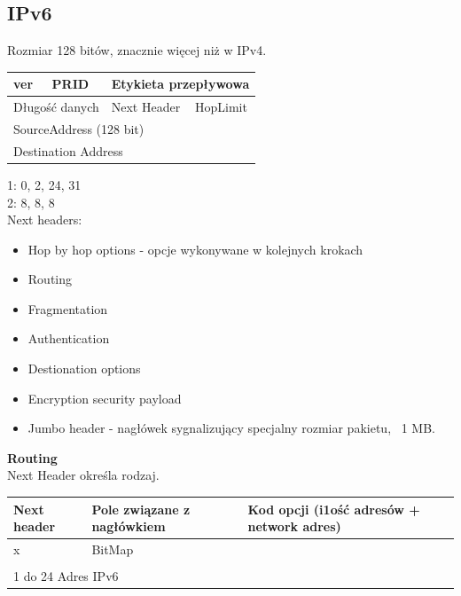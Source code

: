 \subsection{IPv6}
Rozmiar 128 bitów, znacznie więcej niż w IPv4.

\begin{table}[h]
	\begin{tabular}{|l|l|l|l|l|}
		\hline
		ver       & PRID       & \multicolumn{3}{l|}{Etykieta przepływowa}      \\ \hline
		\multicolumn{3}{|l|}{Długość danych} & Next Header      & HopLimit      \\ \hline
		\multicolumn{5}{|l|}{SourceAddress (128 bit)}                           \\ \hline
		\multicolumn{5}{|l|}{Destination Address}                               \\ \hline
	\end{tabular}
\end{table}
1: 0, 2, 24, 31\\
2: 8, 8, 8\\
Next headers:
\begin{itemize}
	\item Hop by hop options - opcje wykonywane w kolejnych krokach
	\item Routing
	\item Fragmentation
	\item Authentication
	\item Destionation options
	\item Encryption security payload
	\item Jumbo header - nagłówek sygnalizujący specjalny rozmiar pakietu, ~1 MB.
\end{itemize}
\textbf{Routing}\\
Next Header określa rodzaj.\\
\begin{table}[h]
	\begin{tabular}{|l|l|l|l|l|}
		\hline
		Next header & Pole związane z nagłówkiem & \multicolumn{3}{l|}{Kod opcji (i1ość adresów + network adres)} \\ \hline
		x           & \multicolumn{4}{l|}{BitMap}                                                                 \\ \hline
		\multicolumn{5}{|l|}{}                                                                                    \\ \hline
		\multicolumn{5}{|l|}{1 do 24 Adres IPv6}                                                                  \\ \hline
	\end{tabular}
\end{table}

